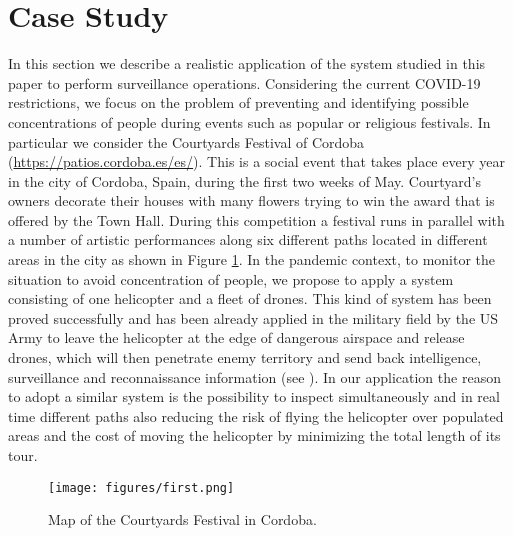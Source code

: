 \section{Case Study\label{section:CS}}

\noindent
In this section\CV{,} we describe a realistic application of the system studied in this paper to perform surveillance operations. Considering the current COVID-19 restrictions, we focus on the problem of preventing and identifying possible concentrations of people during events such as popular or religious festivals. In particular\CV{,} we consider the Courtyards Festival of Cordoba (\url{https://patios.cordoba.es/es/}). This is a social event that takes place every year in the city of Cordoba, Spain, during the first two weeks of May. Courtyard’s owners decorate their houses with many flowers trying to win the award that is offered by the Town Hall. During this competition\CV{,} a festival runs in parallel with a number of artistic performances along six different paths located in different areas in the city as shown in Figure \ref{fig:mapPF}.
In the pandemic context, to monitor the situation to avoid  concentration of people, we propose to apply a system consisting of one helicopter and a fleet of  drones.
This kind of system has been proved successfully and has been already applied in the military field by the US Army to leave the helicopter at the edge of dangerous airspace and release drones, which will then penetrate  enemy territory and send back intelligence, surveillance and reconnaissance information (see \cite{FGA}).
In our application\CV{,} the reason to adopt a similar system is the possibility to inspect simultaneously and in real time different paths\CV{,} also reducing the risk of flying the helicopter over populated areas and the cost of moving the helicopter by minimizing the total length of its tour.

\begin{figure}[h!]
\centering
\texttt{[image: figures/first.png]}
\caption{Map of the Courtyards Festival in Cordoba. \label{fig:mapPF}}
\end{figure}

